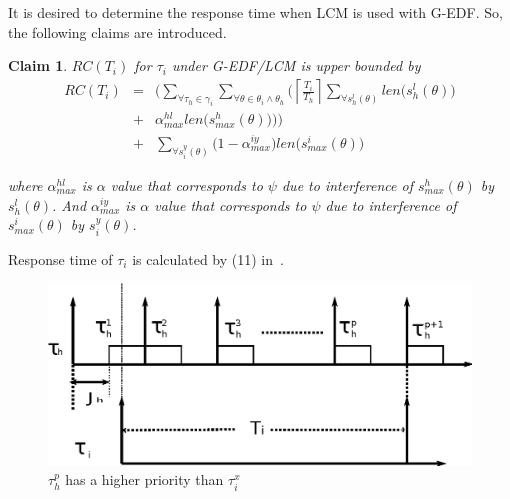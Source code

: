 \documentclass[conference]{sig-alternate}
\newtheorem{clm}{Claim}
\begin{document}
It is desired to determine the response time when LCM is used with G-EDF. So, the following claims are introduced.

\begin{clm}\label{GEDF/LCM response time}
$RC(T_i)$ for $\tau_i$ under G-EDF/LCM is upper bounded by
\begin{eqnarray}
RC(T_i) & = & \Bigg(\sum_{\forall \tau_h \in \gamma_i}\sum_{\forall\theta \in \theta_i \wedge \theta_h}\Bigg(\left\lceil\frac{T_{i}}{T_{h}}\right\rceil\sum_{\forall s_{h}^{l}(\theta)}len\Big(s_{h}^{l}(\theta)\Big)\nonumber\\
& + & \alpha_{max}^{hl}len\Big(s_{max}^{h}(\theta)\Big)\Bigg)\Bigg)\nonumber\\
& + & \sum_{\forall s_{i}^{y}(\theta)}\Big(1-\alpha_{max}^{iy}\Big)len\Big(s_{max}^i(\theta)\Big)  
\label{eq78}\end{eqnarray} 

where $\alpha_{max}^{hl}$ is $\alpha$ value that corresponds to $\psi$ due to interference of $s_{max}^h(\theta)$ by $s_h^l(\theta)$. And $\alpha_{max}^{iy}$ is $\alpha$ value that corresponds to $\psi$ due to interference of $s_{max}^i(\theta)$ by $s_i^y(\theta)$.
\end{clm}

Response time of $\tau_{i}$ is calculated by (11) in~\cite{stmconcurrencycontrol:emsoft11}.
\begin{figure}
\begin{centering}
\includegraphics[scale=0.5]{figures/figure18}
\par\end{centering}
\caption{\label{fig17}$\tau_h^p$ has a higher priority than $\tau_i^x$}
\end{figure}
\end{document}
